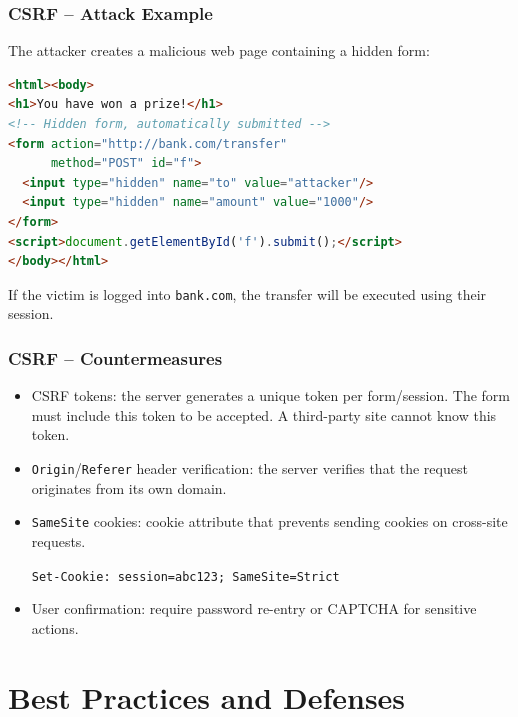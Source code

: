\documentclass{beamer}
\begin{document}
\begin{frame}[fragile]
\frametitle{CSRF -- Attack Example}

The attacker creates a malicious web page containing a hidden form:

\begin{lstlisting}[language=HTML,title={\texttt{Malicious page}}]
<html><body>
<h1>You have won a prize!</h1>
<!-- Hidden form, automatically submitted -->
<form action="http://bank.com/transfer"
      method="POST" id="f">
  <input type="hidden" name="to" value="attacker"/>
  <input type="hidden" name="amount" value="1000"/>
</form>
<script>document.getElementById('f').submit();</script>
</body></html>
\end{lstlisting}

If the victim is logged into \texttt{bank.com}, the transfer will be executed using their session.
\end{frame}


\begin{frame}
\frametitle{CSRF -- Countermeasures}

\begin{itemize}
\item \alert{CSRF tokens}: the server generates a unique token per form/session. The form must include this token to be accepted. A third-party site cannot know this token.
\item \alert{\texttt{Origin}/\texttt{Referer} header verification}: the server verifies that the request originates from its own domain.
\item \alert{\texttt{SameSite} cookies}: cookie attribute that prevents sending cookies on cross-site requests.
\begin{center}
\texttt{Set-Cookie: session=abc123; SameSite=Strict}
\end{center}
\item \alert{User confirmation}: require password re-entry or CAPTCHA for sensitive actions.
\end{itemize}
\end{frame}


\section{Best Practices and Defenses}
\end{document}
